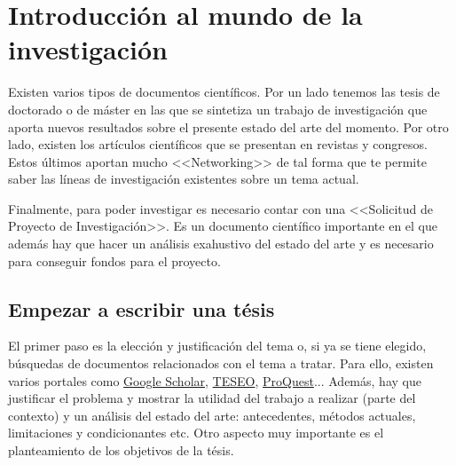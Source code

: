 
\newcommand{\estudiante}{García Justel, Alan}
\newcommand{\titulo}{MÁSTER EN INGENIERÍA COMPUTACIONAL Y SISTEMAS INTELIGENTES}
\newcommand{\asignatura}{METODOLOGÍAS Y TÉCNICAS DE INVESTIGACIÓN}
\newcommand{\portada}{common/no_signal.png}
\newcommand{\colorportada}{title_red}
\newcommand{\curso}{2024-2025}





\newpage


\section{Introducción al mundo de la investigación}
Existen varios tipos de documentos científicos. Por un lado tenemos las tesis de doctorado o de máster en las que se sintetiza un trabajo de investigación que aporta nuevos resultados sobre el presente estado del arte del momento. Por otro lado, existen los artículos científicos que se presentan en revistas y congresos. Estos últimos aportan mucho <<Networking>> de tal forma que te permite saber las líneas de investigación existentes sobre un tema actual.

Finalmente, para poder investigar es necesario contar con una <<Solicitud de Proyecto de Investigación>>. Es un documento científico importante en el que además hay que hacer un análisis exahustivo del estado del arte y es necesario para conseguir fondos para el proyecto. 

\subsection{Empezar a escribir una tésis}
El primer paso es la elección y justificación del tema o, si ya se tiene elegido, búsquedas de documentos relacionados con el tema a tratar. Para ello, existen varios portales como \href{https://scholar.google.es/}{Google Scholar}, \href{https://www.educacion.gob.es/teseo/irGestionarConsulta.do}{TESEO}, \href{https://www.proquest.com/}{ProQuest}... Además, hay que justificar el problema y mostrar la utilidad del trabajo a realizar (parte del contexto) y un análisis del estado del arte: antecedentes, métodos actuales, limitaciones y condicionantes etc. Otro aspecto muy importante es el planteamiento de los objetivos de la tésis.

